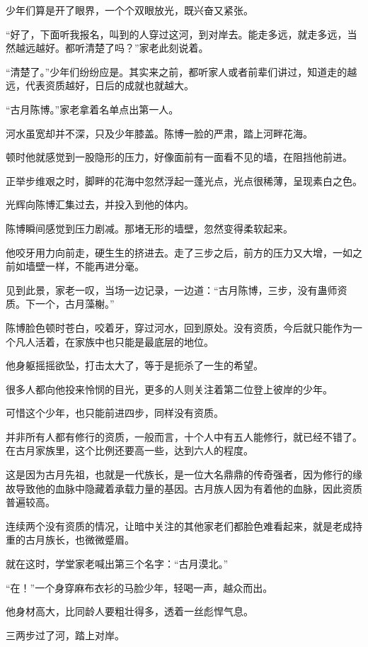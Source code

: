 \begin{this_body}
少年们算是开了眼界，一个个双眼放光，既兴奋又紧张。

“好了，下面听我报名，叫到的人穿过这河，到对岸去。能走多远，就走多远，当然越远越好。都听清楚了吗？”家老此刻说着。

“清楚了。”少年们纷纷应是。其实来之前，都听家人或者前辈们讲过，知道走的越远，代表资质越好，日后的成就也就越大。

“古月陈博。”家老拿着名单点出第一人。

河水虽宽却并不深，只及少年膝盖。陈博一脸的严肃，踏上河畔花海。

顿时他就感觉到一股隐形的压力，好像面前有一面看不见的墙，在阻挡他前进。

正举步维艰之时，脚畔的花海中忽然浮起一蓬光点，光点很稀薄，呈现素白之色。

光辉向陈博汇集过去，并投入到他的体内。

陈博瞬间感觉到压力剧减。那堵无形的墙壁，忽然变得柔软起来。

他咬牙用力向前走，硬生生的挤进去。走了三步之后，前方的压力又大增，一如之前如墙壁一样，不能再进分毫。

见到此景，家老一叹，当场一边记录，一边道：“古月陈博，三步，没有蛊师资质。下一个，古月藻榭。”

陈博脸色顿时苍白，咬着牙，穿过河水，回到原处。没有资质，今后就只能作为一个凡人活着，在家族中也只能是最底层的地位。

他身躯摇摇欲坠，打击太大了，等于是扼杀了一生的希望。

很多人都向他投来怜悯的目光，更多的人则关注着第二位登上彼岸的少年。

可惜这个少年，也只能前进四步，同样没有资质。

并非所有人都有修行的资质，一般而言，十个人中有五人能修行，就已经不错了。在古月家族里，这个比例还要高一些，达到六人的程度。

这是因为古月先祖，也就是一代族长，是一位大名鼎鼎的传奇强者，因为修行的缘故导致他的血脉中隐藏着承载力量的基因。古月族人因为有着他的血脉，因此资质普遍较高。

连续两个没有资质的情况，让暗中关注的其他家老们都脸色难看起来，就是老成持重的古月族长，也微微蹙眉。

就在这时，学堂家老喊出第三个名字：“古月漠北。”

“在！”一个身穿麻布衣衫的马脸少年，轻喝一声，越众而出。

他身材高大，比同龄人要粗壮得多，透着一丝彪悍气息。

三两步过了河，踏上对岸。


\end{this_body}
